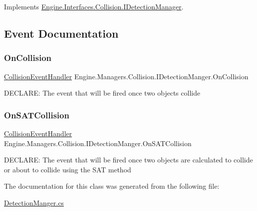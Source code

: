 Implements \hyperlink{a00430_aeaa36b46e3ecd301b2fce9197fb0a35c}{Engine.\+Interfaces.\+Collision.\+I\+Detection\+Manager}.



\subsection{Event Documentation}
\mbox{\label{a00502_a030c2301f7a7ec14a4d852f3f039b22a}} 
\subsubsection{\texorpdfstring{On\+Collision}{OnCollision}}
{\footnotesize\ttfamily \hyperlink{a00502_a7a0a94d84fd7588d01218d607e7b1d27}{Collision\+Event\+Handler} Engine.\+Managers.\+Collision.\+I\+Detection\+Manger.\+On\+Collision}



D\+E\+C\+L\+A\+RE\+: The event that will be fired once two objects collide 

\mbox{\label{a00502_a4eb9637ff1544210696df98bae59b07e}} 
\subsubsection{\texorpdfstring{On\+S\+A\+T\+Collision}{OnSATCollision}}
{\footnotesize\ttfamily \hyperlink{a00502_a7a0a94d84fd7588d01218d607e7b1d27}{Collision\+Event\+Handler} Engine.\+Managers.\+Collision.\+I\+Detection\+Manger.\+On\+S\+A\+T\+Collision}



D\+E\+C\+L\+A\+RE\+: The event that will be fired once two objects are calculated to collide or about to collide using the S\+AT method 



The documentation for this class was generated from the following file\+:\begin{DoxyCompactItemize}
\item 
\hyperlink{a00158}{Detection\+Manger.\+cs}\end{DoxyCompactItemize}
